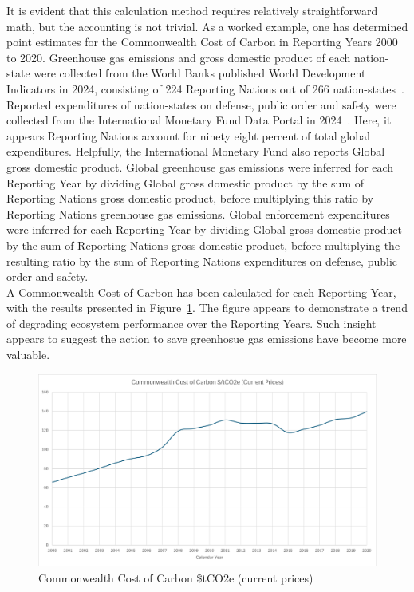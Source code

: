 \documentclass[11pt, oneside]{article}   	%
\begin{document}
It is evident that this calculation method requires relatively straightforward math, but the accounting is not trivial.
As a worked example, one has determined point estimates for the Commonwealth Cost of Carbon in Reporting Years 2000 to 2020.
Greenhouse gas emissions and gross domestic product of each nation-state were collected from the World Banks published World Development Indicators in 2024, consisting of 224 Reporting Nations out of 266 nation-states~\cite{wbank}.
Reported expenditures of nation-states on defense, public order and safety were collected from the International Monetary Fund Data Portal in 2024~\cite{imf}.
Here, it appears Reporting Nations account for ninety eight percent of total global expenditures.
Helpfully, the International Monetary Fund also reports Global gross domestic product.
Global greenhouse gas emissions were inferred for each Reporting Year by dividing Global gross domestic product by the sum of Reporting Nations gross domestic product, before multiplying this ratio by Reporting Nations greenhouse gas emissions.
Global enforcement expenditures were inferred for each Reporting Year by dividing Global gross domestic product by the sum of Reporting Nations gross domestic product, before multiplying the resulting ratio by the sum of Reporting Nations expenditures on defense, public order and safety.\\

A Commonwealth Cost of Carbon has been calculated for each Reporting Year, with the results presented in Figure~\ref{CCC figure}.
The figure appears to demonstrate a trend of degrading ecosystem performance over the Reporting Years.
Such insight appears to suggest the action to save greenhosue gas emissions have become more valuable.\\

\begin{figure}[H]
\centering
\includegraphics[width=1\textwidth]{ccc}
\caption{Commonwealth Cost of Carbon \$tCO2e (current prices)}
\label{CCC figure}
\end{figure}
\end{document}
